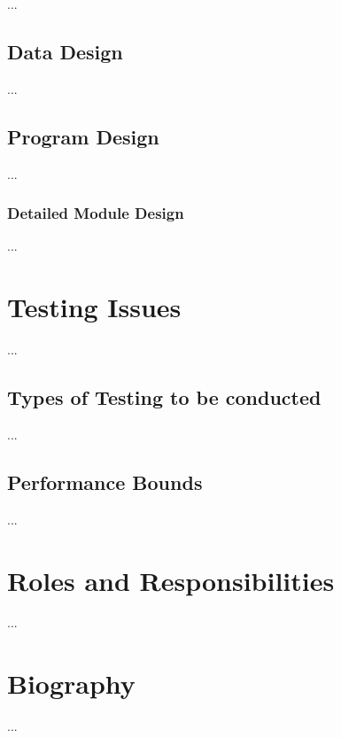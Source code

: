 \documentclass[11pt,a4paper,titlepage]{report}
\begin{document}
...

\subsection{Data Design}

...

\subsection{Program Design}

...

\subsubsection{Detailed Module Design}

...


\section{Testing Issues}

...

\subsection{Types of Testing to be conducted}

...

\subsection{Performance Bounds}

...




\section{Roles and Responsibilities}

...

\section{Biography}

...
\end{document}

